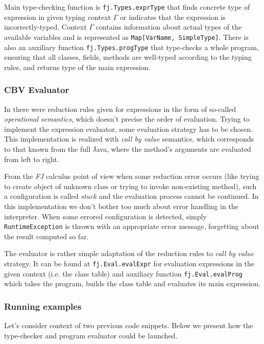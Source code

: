\documentclass{article}[12pt]
\begin{document}
Main type-checking function is \texttt{fj.Types.exprType} that
finds concrete type of expression in given typing context $\Gamma$
or indicates that the expression is incorrectly-typed. Context
$\Gamma$ contains information about actual types of the available
variables and is represented as \texttt{Map[VarName, SimpleType]}.
There is also an auxiliary function \texttt{fj.Types.progType}
that type-checks a whole program, ensuring that all classes, fields,
methods are well-typed according to the typing rules, and returns
type of the main expression.

\subsubsection{CBV Evaluator}

In \cite{fj} there were reduction rules given for expressions in
the form of so-called \emph{operational semantics}, which doesn't
precise the order of evaluation. Trying to implement the expression
evaluator, some evaluation strategy has to be chosen. This
implementation is realized with \emph{call by value} semantics,
which corresponds to that known from the full Java, where
the method's arguments are evaluated from left to right.

From the \emph{FJ} calculus point of view when some reduction error
occurs (like trying to create object of unknown class or trying to
invoke non-existing method), such a configuration is called
\emph{stuck} and the evaluation process cannot be continued.
In this implementation we don't bother too much about error
handling in the interpreter. When some errored configuration is
detected, simply \texttt{RuntimeException} is thrown with
an appropriate error message, forgetting about the result
computed so far.

The evaluator is rather simple adaptation of the reduction rules to
\emph{call by value} strategy. It can be found at
\texttt{fj.Eval.evalExpr} for evaluation expressions in the given
context (i.e. the class table) and auxiliary function
\texttt{fj.Eval.evalProg} which takes the program, builds the
class table and evaluates its main expression.

\subsubsection{Running examples}

Let's consider context of two previous code snippets. Below
we present how the type-checker and program evaluator could be
launched.
\end{document}

